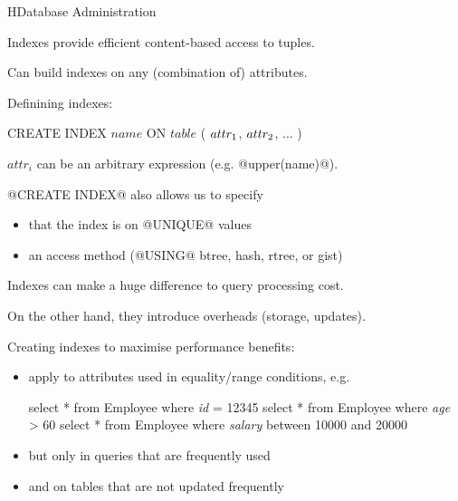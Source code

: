 \begin{lecture}{H}{Database Administration}
\begin{slide}
Indexes provide efficient content-based access to tuples.

Can build indexes on any (combination of) attributes.

Definining indexes:
\begin{syntax}
    CREATE INDEX \(name\) ON \(table\) ( \(attr\sb{1}\), \(attr\sb{2}\), ... )
\end{syntax}
$attr_{i}$ can be an arbitrary expression (e.g. @upper(name)@).

@CREATE INDEX@ also allows us to specify
\begin{itemize}
\vspace{-1ex}\item that the index is on @UNIQUE@ values
\vspace{-1ex}\item an access method (@USING@ btree, hash, rtree, or gist)
\end{itemize}
\end{slide}

\begin{slide}
Indexes can make a huge difference to query processing cost.

On the other hand, they introduce overheads (storage, updates).

Creating indexes to maximise performance benefits:
\begin{itemize}
\item apply to attributes used in equality/range conditions, e.g.
\begin{indent}
\begin{small}
\begin{session}
    select * from Employee where {\em{id}} = 12345
    select * from Employee where {\em{age}} > 60
    select * from Employee where {\em{salary}} between 10000 and 20000
\end{session}
\end{small}
\end{indent}
\item but only in queries that are frequently used
\item and on tables that are not updated frequently
\end{itemize}
\end{slide}


\end{lecture}
